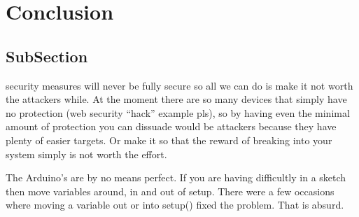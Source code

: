 %

\chapter{Conclusion}
\label{conc}


\section{SubSection}

security measures will never be fully secure so all we can do is make it not worth the attackers while. At the moment there are so many devices that simply have no protection (web security ``hack'' example pls), so by having even the minimal amount of protection you can dissuade would be attackers because they have plenty of easier targets. Or make it so that the reward of breaking into your system simply is not worth the effort.


The Arduino's are by no means perfect. If you are having difficultly in a sketch then move variables around, in and out of setup. There were a few occasions where moving a variable out or into setup() fixed the problem. That is absurd.